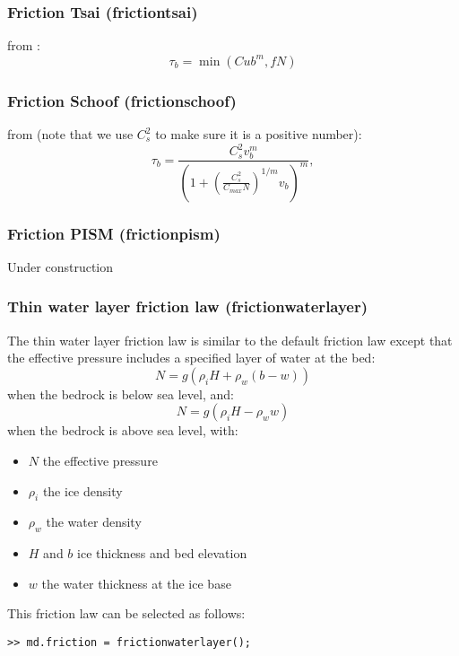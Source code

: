 \subsubsection{Friction Tsai (frictiontsai)}
from \citep{Tsai2015}:
\begin{equation}
	\tau_b = \min\left(C ub^{m} , f N \right) 
\end{equation}

\subsubsection{Friction Schoof (frictionschoof)}
from \citep{Schoof2005,Gagliardini2007} (note that we use $C_s^2$ to make sure it is a positive number):
\begin{equation}
	\tau_b = \frac{C_s^2 v_b^{m}}{\left(1 + \left(\frac{C_s^2}{C_{max}N}\right)^{1/m} v_b\right)^{m}},
\end{equation}

\subsubsection{Friction PISM (frictionpism)}
Under construction

\subsubsection{Thin water layer friction law (frictionwaterlayer)}
The thin water layer friction law is similar to the default friction law except that the effective pressure includes a specified layer of water at the bed:
\begin{equation}
	N= g \left( \rho_i H + \rho_w \left( b - w\right) \right)
\end{equation}
when the bedrock is below sea level, and:
\begin{equation}
	N= g \left( \rho_i H - \rho_w w \right)
\end{equation}
when the bedrock is above sea level, with:
\begin{itemize}
	\item $N$ the effective pressure
	\item $\rho_i$ the ice density
	\item $\rho_w$ the water density
	\item $H$ and $b$ ice thickness and bed elevation
	\item $w$ the water thickness at the ice base
\end{itemize}

This friction law can be selected as follows:
\begin{lstlisting}
>> md.friction = frictionwaterlayer();
\end{lstlisting}

